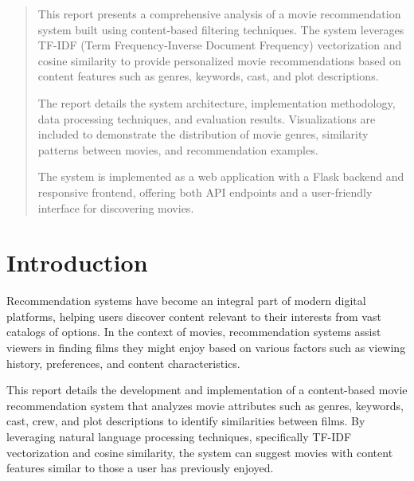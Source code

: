 \documentclass[12pt,a4paper]{article}
\begin{document}
\vspace*{3cm}
\begin{mdframed}[linewidth=1pt, linecolor=framecolor, backgroundcolor=white, roundcorner=10pt, innerleftmargin=15pt, innerrightmargin=15pt, innertopmargin=15pt, innerbottommargin=15pt]
    \begin{abstract}
        \setlength{\parindent}{1em}
        \setlength{\parskip}{0.5em}
         This report presents a comprehensive analysis of a movie recommendation system built using content-based filtering techniques. The system leverages TF-IDF (Term Frequency-Inverse Document Frequency) vectorization and cosine similarity to provide personalized movie recommendations based on content features such as genres, keywords, cast, and plot descriptions.
        
         The report details the system architecture, implementation methodology, data processing techniques, and evaluation results. Visualizations are included to demonstrate the distribution of movie genres, similarity patterns between movies, and recommendation examples.
        
         The system is implemented as a web application with a Flask backend and responsive frontend, offering both API endpoints and a user-friendly interface for discovering movies.
    \end{abstract}
\end{mdframed}

\vspace{1cm}


\newpage
\tableofcontents
\newpage

\section{Introduction}

Recommendation systems have become an integral part of modern digital platforms, helping users discover content relevant to their interests from vast catalogs of options. In the context of movies, recommendation systems assist viewers in finding films they might enjoy based on various factors such as viewing history, preferences, and content characteristics.

This report details the development and implementation of a content-based movie recommendation system that analyzes movie attributes such as genres, keywords, cast, crew, and plot descriptions to identify similarities between films. By leveraging natural language processing techniques, specifically TF-IDF vectorization and cosine similarity, the system can suggest movies with content features similar to those a user has previously enjoyed.
\end{document}
